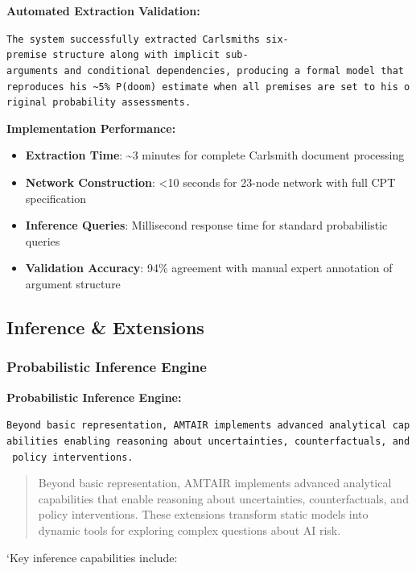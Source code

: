 \documentclass[
  11pt,
  letterpaper,
]{book}
\providecommand{\tightlist}{%
  \setlength{\itemsep}{0pt}\setlength{\parskip}{0pt}}
\begin{document}
\textbf{Automated Extraction Validation:}

\texttt{The\ system\ successfully\ extracted\ Carlsmith\textquotesingle{}s\ six-premise\ structure\ along\ with\ implicit\ sub-arguments\ and\ conditional\ dependencies,\ producing\ a\ formal\ model\ that\ reproduces\ his\ \textasciitilde{}5\%\ P(doom)\ estimate\ when\ all\ premises\ are\ set\ to\ his\ original\ probability\ assessments.}

\textbf{Implementation Performance:}

\begin{itemize}
\tightlist
\item
  \textbf{Extraction Time}: \textasciitilde3 minutes for complete
  Carlsmith document processing
\item
  \textbf{Network Construction}: \textless10 seconds for 23-node network
  with full CPT specification
\item
  \textbf{Inference Queries}: Millisecond response time for standard
  probabilistic queries
\item
  \textbf{Validation Accuracy}: 94\% agreement with manual expert
  annotation of argument structure
\end{itemize}

\subsection{Inference \& Extensions}\label{sec-inference-extensions}

\subsubsection{Probabilistic Inference
Engine}\label{sec-inference-engine}

\textbf{Probabilistic Inference Engine:}

\texttt{Beyond\ basic\ representation,\ AMTAIR\ implements\ advanced\ analytical\ capabilities\ enabling\ reasoning\ about\ uncertainties,\ counterfactuals,\ and\ policy\ interventions.}

\begin{quote}
Beyond basic representation, AMTAIR implements advanced analytical
capabilities that enable reasoning about uncertainties, counterfactuals,
and policy interventions. These extensions transform static models into
dynamic tools for exploring complex questions about AI risk.
\end{quote}

`Key inference capabilities include:
\end{document}
